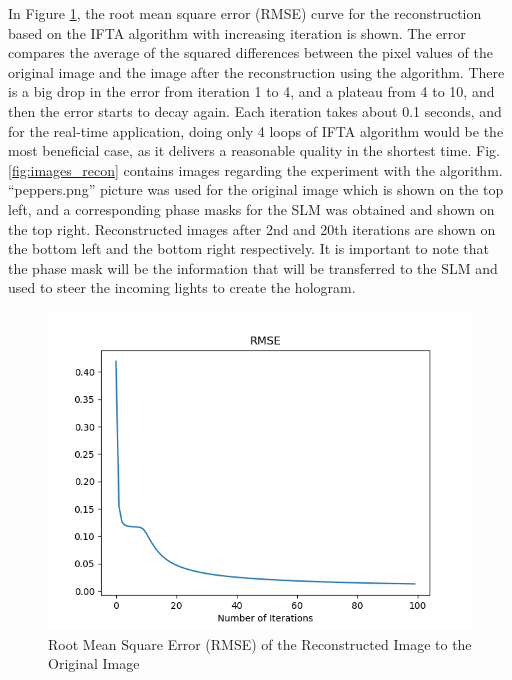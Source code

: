 \documentclass[12pt]{article}
\begin{document}
In Figure \ref{fig:RMSE}, the root mean square error (RMSE) curve for the reconstruction based on the IFTA algorithm with increasing iteration is shown. The error compares the average of the squared differences between the pixel values of the original image and the image after the reconstruction using the algorithm. There is a big drop in the error from iteration 1 to 4, and a plateau from 4 to 10, and then the error starts to decay again. Each iteration takes about 0.1 seconds, and for the real-time application, doing only 4 loops of IFTA algorithm would be the most beneficial case, as it delivers a reasonable quality in the shortest time. Fig. \ref{fig:images_recon} contains images regarding the experiment with the algorithm. ``peppers.png'' picture was used for the original image which is shown on the top left, and a corresponding phase masks for the SLM was obtained and shown on the top right. Reconstructed images after 2nd and 20th iterations are shown on the bottom left and the bottom right respectively. It is important to note that the phase mask will be the information that will be transferred to the SLM and used to steer the incoming lights to create the hologram.

\begin{figure}
    \centering
    \includegraphics[width=\textwidth]{subroutine2.png}
    \caption{Root Mean Square Error (RMSE) of the Reconstructed Image to the Original Image}
    \label{fig:RMSE}
\end{figure}
\end{document}
